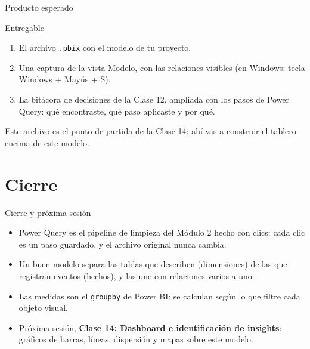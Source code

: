 \documentclass[aspectratio=169,11pt]{beamer}
\begin{document}
\begin{frame}[t]{Producto esperado}
  \begin{exampleblock}{Entregable}
    \small
    \begin{enumerate}
      \item El archivo \texttt{.pbix} con el modelo de tu proyecto.
      \item Una captura de la vista Modelo, con las relaciones visibles
        (en Windows: tecla Windows + Mayús + S).
      \item La bitácora de decisiones de la Clase 12, ampliada con los
        pasos de Power Query: qué encontraste, qué paso aplicaste y por
        qué.
    \end{enumerate}
  \end{exampleblock}
  \small Este archivo es el punto de partida de la Clase 14: ahí vas a
  construir el tablero encima de este modelo.
\end{frame}

\section{Cierre}
\begin{frame}[t]{Cierre y próxima sesión}
  \begin{itemize}
    \item Power Query es el pipeline de limpieza del Módulo 2 hecho con
      clics: cada clic es un paso guardado, y el archivo original nunca
      cambia.
    \item Un buen modelo separa las tablas que describen (dimensiones) de
      las que registran eventos (hechos), y las une con relaciones varios a
      uno.
    \item Las medidas son el \texttt{groupby} de Power BI: se calculan
      según lo que filtre cada objeto visual.
    \item Próxima sesión, \textbf{Clase 14: Dashboard e identificación de
      insights}: gráficos de barras, líneas, dispersión y mapas sobre este
      modelo.
  \end{itemize}
\end{frame}
\end{document}
